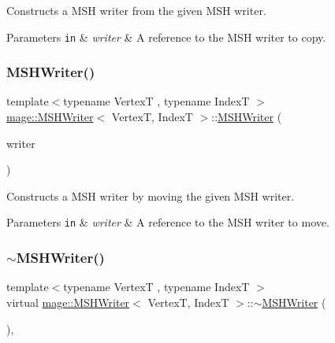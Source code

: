 Constructs a M\+SH writer from the given M\+SH writer.


\begin{DoxyParams}[1]{Parameters}
\mbox{\tt in}  & {\em writer} & A reference to the M\+SH writer to copy. \\
\hline
\end{DoxyParams}
\hypertarget{classmage_1_1_m_s_h_writer_a35475ef50054a431e5f271221cb29753}{}\label{classmage_1_1_m_s_h_writer_a35475ef50054a431e5f271221cb29753} 
\subsubsection{\texorpdfstring{M\+S\+H\+Writer()}{MSHWriter()}\hspace{0.1cm}{\footnotesize\ttfamily [3/3]}}
{\footnotesize\ttfamily template$<$typename VertexT , typename IndexT $>$ \\
\hyperlink{classmage_1_1_m_s_h_writer}{mage\+::\+M\+S\+H\+Writer}$<$ VertexT, IndexT $>$\+::\hyperlink{classmage_1_1_m_s_h_writer}{M\+S\+H\+Writer} (\begin{DoxyParamCaption}\item[{\hyperlink{classmage_1_1_m_s_h_writer}{M\+S\+H\+Writer}$<$ VertexT, IndexT $>$ \&\&}]{writer }\end{DoxyParamCaption})\hspace{0.3cm}{\ttfamily [delete]}}

Constructs a M\+SH writer by moving the given M\+SH writer.


\begin{DoxyParams}[1]{Parameters}
\mbox{\tt in}  & {\em writer} & A reference to the M\+SH writer to move. \\
\hline
\end{DoxyParams}
\hypertarget{classmage_1_1_m_s_h_writer_a8ab2e05e9fce4e02f1f1a3117dfb0062}{}\label{classmage_1_1_m_s_h_writer_a8ab2e05e9fce4e02f1f1a3117dfb0062} 
\subsubsection{\texorpdfstring{$\sim$\+M\+S\+H\+Writer()}{~MSHWriter()}}
{\footnotesize\ttfamily template$<$typename VertexT , typename IndexT $>$ \\
virtual \hyperlink{classmage_1_1_m_s_h_writer}{mage\+::\+M\+S\+H\+Writer}$<$ VertexT, IndexT $>$\+::$\sim$\hyperlink{classmage_1_1_m_s_h_writer}{M\+S\+H\+Writer} (\begin{DoxyParamCaption}{ }\end{DoxyParamCaption})\hspace{0.3cm}{\ttfamily [virtual]}, {\ttfamily [default]}}

